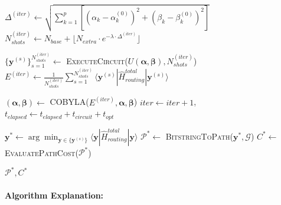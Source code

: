 \documentclass[lettersize,journal]{IEEEtran}
\begin{document}
\begin{algorithm}[t]
{    
    \label{line:wr_deviation}
    $\Delta^{(iter)} \leftarrow \sqrt{\sum_{k=1}^{p} [(\alpha_k - \alpha_k^{(0)})^2 + (\beta_k - \beta_k^{(0)})^2]}$\;
    \label{line:wr_shots}
    $N_{shots}^{(iter)} \leftarrow N_{base} + \lfloor N_{extra} \cdot e^{-\lambda \cdot \Delta^{(iter)}} \rfloor$ 
    
    \label{line:wr_execute}
    $\{\mathbf{y}^{(s)}\}_{s=1}^{N_{shots}^{(iter)}} \leftarrow$ \textsc{ExecuteCircuit}($U(\boldsymbol{\alpha}, \boldsymbol{\beta}), N_{shots}^{(iter)}$)\;
    \label{line:wr_energy}
    $E^{(iter)} \leftarrow \frac{1}{N_{shots}^{(iter)}} \sum_{s=1}^{N_{shots}^{(iter)}} \langle \mathbf{y}^{(s)} | \hat{H}_{routing}^{total} | \mathbf{y}^{(s)} \rangle$\;
    
    \label{line:wr_optimize}
    $(\boldsymbol{\alpha}, \boldsymbol{\beta}) \leftarrow$ \textsc{COBYLA}($E^{(iter)}, \boldsymbol{\alpha}, \boldsymbol{\beta}$)\;
    \label{line:wr_iter}
    $iter \leftarrow iter + 1$, $t_{elapsed} \leftarrow t_{elapsed} + t_{circuit} + t_{opt}$\;
}
\label{line:wr_loop_end}

\label{line:wr_best}
$\mathbf{y}^* \leftarrow \arg\min_{\mathbf{y} \in \{\mathbf{y}^{(s)}\}} \langle \mathbf{y} | \hat{H}_{routing}^{total} | \mathbf{y} \rangle$\;
\label{line:wr_path}
$\mathcal{P}^* \leftarrow$ \textsc{BitstringToPath}($\mathbf{y}^*, \mathcal{G}$)\;
\label{line:wr_validate}
\label{line:wr_cost}
$C^* \leftarrow$ \textsc{EvaluatePathCost}($\mathcal{P}^*$)\;

\label{line:wr_return}
\Return $\mathcal{P}^*, C^*$\;
\end{algorithm}

\paragraph{Algorithm Explanation:}
\end{document}
